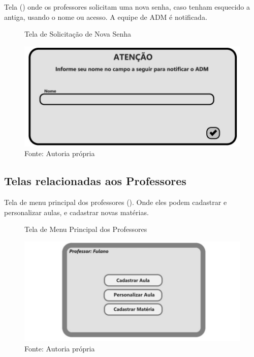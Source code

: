 \documentclass{utfpr-pg}
\begin{document}
    Tela () onde os professores solicitam uma nova senha, caso tenham esquecido a antiga, usando o nome ou acesso. A equipe de ADM é notificada.
       
        \begin{figure}[H]
            \centering
            \captionsetup{width=0.9\textwidth}
            \caption{Tela de Solicitação de Nova Senha}
            \includegraphics[width=\linewidth]{fotos/5.jpg}
            \caption*{Fonte: Autoria própria}
            \label{fig:5}
        \end{figure}

   \subsection{Telas relacionadas aos Professores}
   
    Tela de menu principal dos professores (). Onde eles podem cadastrar e personalizar aulas, e cadastrar novas matérias.
       
        \begin{figure}[H]
            \centering
            \captionsetup{width=0.9\textwidth}
            \caption{Tela de Menu Principal dos Professores}
            \includegraphics[width=\linewidth]{fotos/6.jpg}
            \caption*{Fonte: Autoria própria}
            \label{fig:6}
        \end{figure}
    
\end{document}
